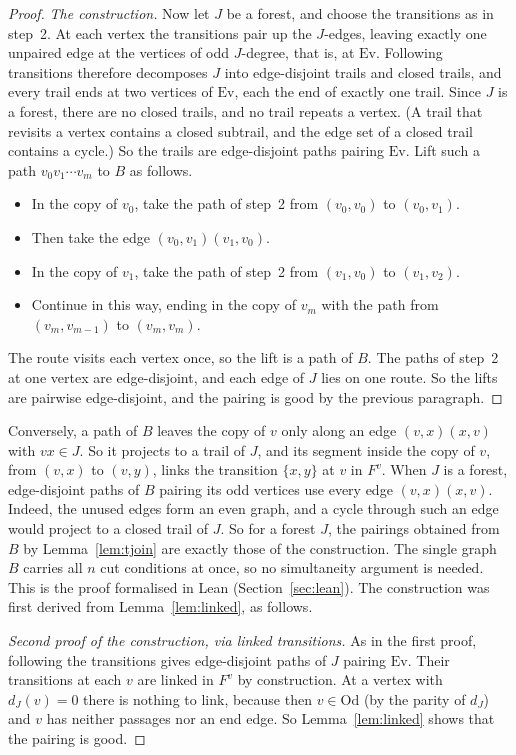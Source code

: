 \documentclass[11pt]{amsart}
\theoremstyle{definition}
\newcommand{\Ev}{\mathrm{Ev}}
\newcommand{\Od}{\mathrm{Od}}
\begin{document}
\begin{proof}
\emph{The construction.} Now let $J$ be a forest, and choose the transitions as in step~2. At each
vertex the transitions pair up the $J$-edges, leaving exactly one unpaired edge at the vertices of odd
$J$-degree, that is, at $\Ev$. Following transitions therefore decomposes $J$ into edge-disjoint
trails and closed trails, and every trail ends at two vertices of $\Ev$, each the end of exactly one
trail. Since $J$ is a forest, there are no closed trails, and no trail repeats a vertex. (A trail
that revisits a vertex contains a closed subtrail, and the edge set of a closed trail contains a
cycle.) So the trails are edge-disjoint paths pairing $\Ev$. Lift such a path $v_0v_1\cdots v_m$ to
$B$ as follows.
\begin{itemize}
\item In the copy of $v_0$, take the path of step~2 from $(v_0,v_0)$ to $(v_0,v_1)$.
\item Then take the edge $(v_0,v_1)(v_1,v_0)$.
\item In the copy of $v_1$, take the path of step~2 from $(v_1,v_0)$ to $(v_1,v_2)$.
\item Continue in this way, ending in the copy of $v_m$ with the path from $(v_m,v_{m-1})$ to
$(v_m,v_m)$.
\end{itemize}
The route visits each vertex once, so the lift is a path of $B$. The paths of step~2 at one vertex are
edge-disjoint, and each edge of $J$ lies on one route. So the lifts are pairwise edge-disjoint, and
the pairing is good by the previous paragraph.
\end{proof}

Conversely, a path of $B$ leaves the copy of $v$ only along an edge $(v,x)(x,v)$ with $vx\in J$. So it
projects to a trail of $J$, and its segment inside the copy of $v$, from $(v,x)$ to $(v,y)$, links the
transition $\{x,y\}$ at $v$ in $F^v$. When $J$ is a forest, edge-disjoint paths of $B$ pairing its odd
vertices use every edge $(v,x)(x,v)$. Indeed, the unused edges form an even graph, and a cycle through
such an edge would project to a closed trail of $J$. So for a forest $J$, the pairings obtained from
$B$ by Lemma~\ref{lem:tjoin} are exactly those of the construction. The single graph $B$ carries all
$n$ cut conditions at once, so no simultaneity argument is needed. This is the proof formalised in
Lean (Section~\ref{sec:lean}). The construction was first derived from Lemma~\ref{lem:linked}, as
follows.

\begin{proof}[Second proof of the construction, via linked transitions]
As in the first proof, following the transitions gives edge-disjoint paths of $J$ pairing $\Ev$.
Their transitions at each $v$ are linked in $F^v$ by construction. At a vertex with $d_J(v)=0$ there is
nothing to link, because then $v\in\Od$ (by the parity of $d_J$) and $v$ has neither passages nor an
end edge. So Lemma~\ref{lem:linked} shows that the pairing is good.
\end{proof}
\end{document}
